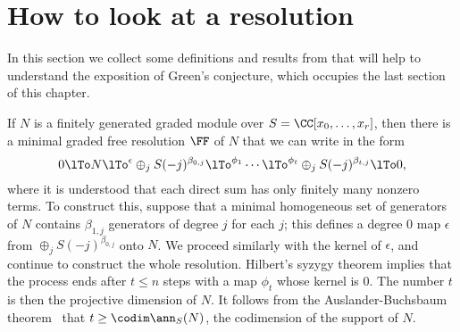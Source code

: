 %
%
%

\section{How to look at a resolution}
In this section we collect some definitions and results from \cite{Eisenbud1995} that will help to understand the exposition of Green's conjecture, which occupies the last section of this chapter.

If $N$ is a finitely generated graded module over $S = \CC[x_0,\dots, x_r]$, then there is a minimal graded free resolution $\FF$
of $N$ that we can write in the form
$$
0\lTo N \lTo^\epsilon \oplus_jS(-j)^{\beta_{0,j}} \lTo^{\phi_1} \cdots \lTo^{\phi_t}\oplus_jS(-j)^{\beta_{t,j}}\lTo 0,
$$
where it is understood that each direct sum has only finitely many nonzero terms.
To construct this, suppose that a minimal homogeneous set of generators of $N$
contains $\beta_{1,j}$ generators of degree $j$ for each $j$; this defines a degree 0 map $\epsilon$
from 
$
\oplus_jS(-j)^{\beta_{0,j}}
$
onto $N$. We proceed similarly with the kernel of $\epsilon$, and continue to construct the whole resolution.
Hilbert's syzygy theorem \cite[***]{Eisenbud1995} implies that the process ends after $t\leq n$ steps with a map $\phi_t$ whose
kernel is 0. The number $t$ is then the projective dimension of $N$. It follows from the Auslander-Buchsbaum
theorem~\cite[***]{Eisenbud1995} that $t \geq \codim \ann_S(N)$, the codimension of the support of $N$.

